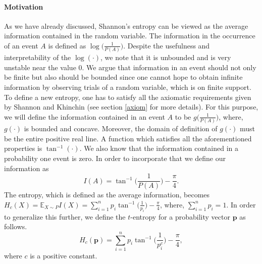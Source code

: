 \documentclass{article}
\newcommand{\bp}{\boldsymbol{p}}
\begin{document}
\paragraph{Motivation} As we have already discussed, Shannon's entropy can be viewed as the average information contained in the random variable. The information in the occurrence of an event $A$ is defined as $\log \big(\frac{1}{P(A)}\big)$. Despite the usefulness and interpretability of the $\log(\cdot)$, we note that it is unbounded and is very unstable near the value 0. We argue that information in an event should not only be finite but also should be bounded since one cannot hope to obtain infinite information by observing trials of a random variable, which is on finite support. To define a new entropy, one has to satisfy all the axiomatic requirements given by Shannon and Khinchin (see section \ref{axiom} for more details). For this purpose, we will define the information contained in an event $A$ to be $g\big(\frac{1}{P(A)}\big)$, where, $g(\cdot)$ is bounded and concave. Moreover, the domain of definition of $g(\cdot)$ must be the entire positive real line. A function which satisfies all the aforementioned properties is $\tan^{-1}(\cdot)$. We also know that the information contained in a probability one event is zero. In order to incorporate that we define our information as 
\begin{equation}
    I(A)=\tan^{-1}\bigg(\frac{1}{P(A)}\bigg)-\frac{\pi}{4}.
\end{equation}
The entropy, which is defined as the average information, becomes $H_c(X)=\mathbb{E}_{X \sim P} I(X)=\sum_{i=1}^n p_i \tan^{-1}\Big(\frac{1}{p_i}\Big)-\frac{\pi}{4}$, where, $\sum_{i=1}^np_i=1$. In order to generalize this further, we define the $t$-entropy for a probability vector $\bp$ as follows. 
\begin{equation}
    H_c(\bp)=\sum_{i=1}^n p_i \tan^{-1}\bigg(\frac{1}{p_i^c}\bigg) - \frac{\pi}{4},
\end{equation}
where $c$ is a positive constant. 
\end{document}
